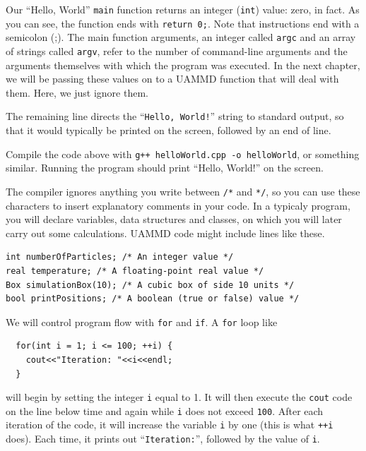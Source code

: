 Our ``Hello, World'' \texttt{main} function returns an integer (\texttt{int})
value: zero, in fact. As you can see, the function ends with \texttt{return 0;}.
Note that instructions end with a semicolon (;). The main function arguments, an
integer called \texttt{argc} and an array of strings called \texttt{argv}, refer
to the number of command-line arguments and the arguments themselves with which
the program was executed. In the next chapter, we will be passing these values
on to a UAMMD function that will deal with them. Here, we just ignore them.

The remaining line directs the ``\texttt{Hello, World!}'' string to standard
output, so that it would typically be printed on the screen, followed by an
end of line.

Compile the code above with \texttt{g++ helloWorld.cpp -o helloWorld}, or
something similar. Running the program should print ``Hello, World!'' on the
screen.

The compiler ignores anything you write between \texttt{/*} and \texttt{*/}, so
you can use these characters to insert explanatory comments in your code. In a
typicaly program, you will declare variables, data structures and classes, on
which you will later carry out some calculations. UAMMD code might include lines
like these.
\begin{lstlisting}
int numberOfParticles; /* An integer value */
real temperature; /* A floating-point real value */
Box simulationBox(10); /* A cubic box of side 10 units */
bool printPositions; /* A boolean (true or false) value */
\end{lstlisting}

We will control program flow with \texttt{for} and \texttt{if}. A \texttt{for}
loop like
\begin{lstlisting}
  for(int i = 1; i <= 100; ++i) {
    cout<<"Iteration: "<<i<<endl;
  }
\end{lstlisting}
will begin by setting the integer \texttt{i} equal to 1. It will then execute
the \texttt{cout} code on the line below time and again while \texttt{i} does
not exceed \texttt{100}. After each iteration of the code, it will increase the
variable \texttt{i} by one (this is what \texttt{++i} does). Each time, it
prints out ``\texttt{Iteration:}'', followed by the value of \texttt{i}.


